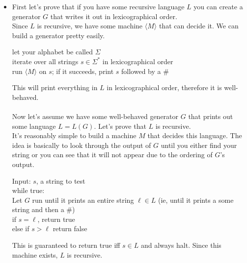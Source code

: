 \documentclass[11pt]{article}
\begin{document}
\begin{solution}
    \begin{itemize}
        \item First let's prove that if you have some recursive language $L$ you can create a generator $G$ that writes it out in lexicographical order.
            \\ Since $L$ is recursive, we have some machine $\langle M \rangle$ that can decide it. We can build a generator pretty easily. 
            \begin{algo}
                let your alphabet be called $\Sigma$
                \\ iterate over all strings $s \in \Sigma^*$ in lexicographical order \+
                \\ run $\langle M \rangle$ on $s$; if it succeeds, print $s$ followed by a $\#$
            \end{algo}
            This will print everything in $L$ in lexicographical order, therefore it is well-behaved. 
            \\ \\ Now let's assume we have some well-behaved generator $G$ that prints out some language $L = L(G)$. Let's prove that $L$ is recursive. 
            \\ It's reasonably simple to build a machine $M$ that decides this language. The idea is basically to look through the output 
            of $G$ until you either find your string or you can see that it will not appear due to the ordering of $G$'s output.
            \begin{algo}
                Input: $s$, a string to test
                \\ while true: \+
                \\ Let $G$ run until it prints an entire string $\ell \in L$ (ie, until it prints a some string and then a \#)
                \\ if $s = \ell$, return true
                \\ else if $s > \ell$ return false \-
            \end{algo}
            This is guaranteed to return true iff $s \in L$ and always halt. Since this machine exists, $L$ is recursive. 
            

\end{itemize}
\end{solution}
\end{document}
